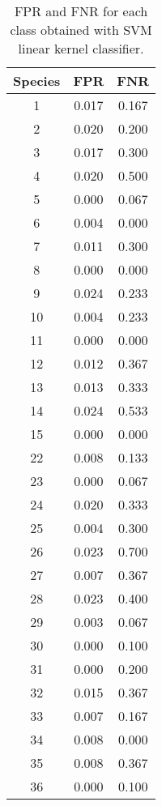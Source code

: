 \documentclass{article}
\begin{document}
\begin{table}
\centering
\begin{minipage}[t]{5cm}
\begin{tabular}{ |c|c|c| } \hline
Species & FPR & FNR \\
\hline
1 & 0.017 & 0.167 \\ 
\hline
2 & 0.020 & 0.200 \\ 
\hline
 3 & 0.017 & 0.300 \\ 
\hline
 4 & 0.020 & 0.500 \\ 
\hline
 5 & 0.000 & 0.067 \\ 
\hline
 6 & 0.004 & 0.000 \\ 
\hline
 7 & 0.011 & 0.300 \\ 
\hline
 8 & 0.000 & 0.000 \\ 
\hline
 9 & 0.024 & 0.233 \\ 
\hline
 10 & 0.004 & 0.233 \\ 
\hline
 11 & 0.000 & 0.000 \\ 
\hline
 12 & 0.012 & 0.367 \\ 
\hline
 13 & 0.013 & 0.333 \\ 
\hline
 14 & 0.024 & 0.533 \\ 
\hline
 15 & 0.000 & 0.000 \\ 
\hline
 22 & 0.008 & 0.133 \\ 
\hline
 23 & 0.000 & 0.067 \\ 
\hline
 24 & 0.020 & 0.333 \\ 
\hline
 25 & 0.004 & 0.300 \\ 
\hline
 26 & 0.023 & 0.700 \\ 
\hline
 27 & 0.007 & 0.367 \\ 
\hline
 28 & 0.023 & 0.400 \\ 
\hline
 29 & 0.003 & 0.067 \\ 
\hline
 30 & 0.000 & 0.100 \\ 
\hline
 31 &  0.000 & 0.200 \\ 
\hline
 32 & 0.015 & 0.367 \\ 
\hline
 33 & 0.007 & 0.167 \\ 
\hline
 34 & 0.008 & 0.000 \\ 
\hline
 35 & 0.008 & 0.367 \\ 
\hline
 36 & 0.000 & 0.100 \\ 
\hline
\end{tabular}
\caption{FPR and FNR for each class obtained with SVM linear kernel classifier.}
\end{minipage}
\hfill
\begin{minipage}[t]{5cm}

\end{minipage}
\end{table}
\end{document}
